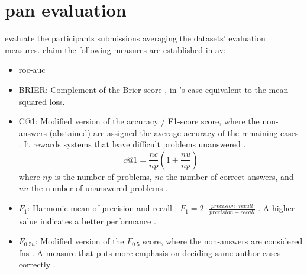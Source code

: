 \section{\acs{pan} evaluation}
\label{sec:pan_evaluation}

\citet{ayele_overview_2024,bevendorff_overview_2024} evaluate the participants submissions averaging the datasets' evaluation measures.
\citet{ayele_overview_2024} claim the following measures are established in \ac{av}:
\begin{itemize}
    \item \ac{roc-auc} \citep{bevendorff_overview_2024,weerasinghe_feature_vector_difference_2021,kocher_unine_2015}
    
    \item BRIER: Complement of the Brier score \citep{bevendorff_overview_2024,weerasinghe_feature_vector_difference_2021}, in \citet{bevendorff_overview_2024}'s case equivalent to the mean squared loss.
    
    \item C@1: Modified version of the accuracy \citep{bevendorff_overview_2024}/ F1-score \citep{weerasinghe_feature_vector_difference_2021} score, 
    where the non-answers (abstained) \citep{llm_detection_av_2025} are assigned the average accuracy of the remaining cases \citep{bevendorff_overview_2024}. 
    It rewards systems that leave difficult problems unanswered \citep{weerasinghe_feature_vector_difference_2021}.
    $$c@1 = \frac{nc}{np}(1+\frac{nu}{np})$$ where $np$ is the number of problems, $nc$ the number of correct answers, 
    and $nu$ the number of unanswered problems \citep{kocher_unine_2015}.
    
    \item $F_1$: Harmonic mean of precision and recall \citep{bevendorff_overview_2024,weerasinghe_feature_vector_difference_2021}:
    $ F_1 = 2 \cdot \frac{precision \cdot recall}{precision + recall} $ \citep{neal_surveying_2018}.
    A higher value indicates a better performance \citep{neal_surveying_2018}.
    
    \item $F_{0.5u}$: Modified version of the $F_{0.5}$ score, where the non-answers are considered \acp{fn} \citep{bevendorff_overview_2024}. A measure that puts more emphasis on deciding same-author cases correctly \citep{weerasinghe_feature_vector_difference_2021}.
\end{itemize}


